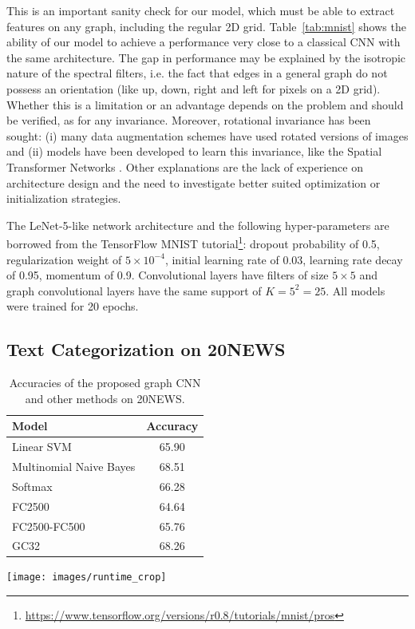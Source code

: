 \documentclass{article}
\newcommand{\tabref}[1]{Table~\ref{tab:#1}}
\newcommand{\todo}[1]{{\color{red} #1 }}
\begin{document}
This is an important sanity check for our model, which must be able to extract
features on any graph, including the regular 2D grid. \tabref{mnist} shows the
ability of our model to achieve a performance very close to a classical CNN
with the same architecture. The gap in performance may be explained by the
isotropic nature of the spectral filters, i.e. the fact that edges in a general
graph do not possess an orientation (like up, down, right and left for pixels
on a 2D grid). Whether this is a limitation or an advantage depends on the
problem and should be verified, as for any invariance. Moreover, rotational
invariance has been sought: (i) many data augmentation schemes have used
rotated versions of images and (ii) models have been developed to learn this
invariance, like the Spatial Transformer Networks \cite{jaderberg2015spatial}.
Other explanations are the lack of experience on architecture design and the
need to investigate better suited optimization or initialization strategies.

The LeNet-5-like network architecture and the following hyper-parameters are
borrowed from the TensorFlow MNIST tutorial\footnote{
\url{https://www.tensorflow.org/versions/r0.8/tutorials/mnist/pros}}: dropout
probability of 0.5, regularization weight of $5\times10^{-4}$, initial learning
rate of 0.03, learning rate decay of 0.95, momentum of 0.9. Convolutional layers
have filters of size $5 \times 5$ and graph convolutional layers have the same
support of $K = 5^2 = 25$. All models were trained for 20 epochs.

\subsection{Text Categorization on 20NEWS}

\begin{table}[t]
\begin{minipage}[b]{0.42\linewidth}
	\centering
	\begin{tabular}[b]{lc}
		\toprule
		Model & Accuracy \\
		\midrule
		Linear SVM & 65.90 \\
		Multinomial Naive Bayes & 68.51 \\
		Softmax & 66.28 \\
		\addlinespace
		FC2500 & 64.64 \\
		FC2500-FC500 & 65.76 \\
		\addlinespace
		GC32 & 68.26 \\
		\bottomrule
	\end{tabular}
	\caption{Accuracies of the proposed graph CNN and other
	methods on 20NEWS.} 
	\label{tab:20news}
\end{minipage}
\hfill
\begin{minipage}[b]{0.55\linewidth}
	\centering
	\texttt{[image: images/runtime\_crop]}
	\label{fig:runtime}
\end{minipage}
\end{table}
\end{document}
